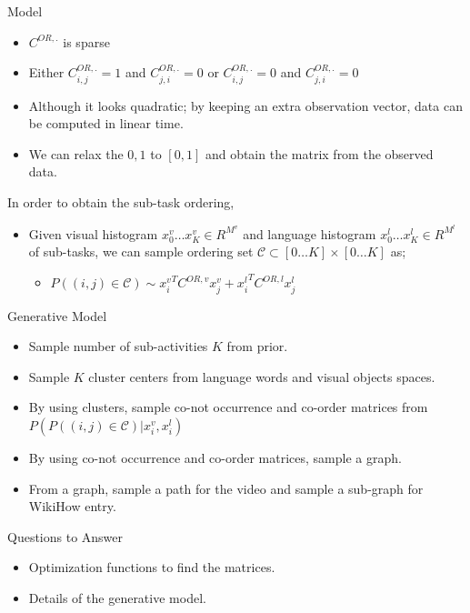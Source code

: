 \begin{frame}{Model}
\begin{itemize}
\item $C^{OR,.}$ is sparse
\item Either $C^{OR,.}_{i,j}=1$ and $C^{OR,.}_{j,i}=0$ or $C^{OR,.}_{i,j}=0$ and $C^{OR,.}_{j,i}=0$
\item Although it looks quadratic; by keeping an extra observation vector, data can be computed in linear time.
\item We can relax the ${0,1}$ to $[0,1]$ and obtain the matrix from the observed data.
\end{itemize}
In order to obtain the sub-task ordering,
\begin{itemize}
\item Given visual histogram $x^v_0 \ldots x^v_K \in R^{M^v}$ and language histogram $x^l_0 \ldots x^l_K \in R^{M^l}$ of sub-tasks, we can sample ordering set $\mathcal{C} \subset [0\ldots K]
 \times [0 \ldots K]$ as;
\begin{itemize}
\item $P((i,j) \in \mathcal{C}) \sim {x^v_i}^T C^{OR,v} x^v_j + {x^l_i}^T C^{OR,l} x^l_j$
\end{itemize}
\end{itemize}
\end{frame}

\begin{frame}{Generative Model}
\begin{itemize}
\item Sample number of sub-activities $K$ from prior.
\item Sample $K$ cluster centers from language words and visual objects spaces.
\item By using clusters, sample co-not occurrence and co-order matrices from $P(P((i,j) \in \mathcal{C})|x^v_i,x^l_i)$
\item By using co-not occurrence and co-order matrices, sample a graph.
\item From a graph, sample a path for the video and sample a sub-graph for WikiHow entry.
\end{itemize}
\end{frame}

\begin{frame}{Questions to Answer}
\begin{itemize}
\item Optimization functions to find the matrices.
\item Details of the generative model.
\end{itemize}
\end{frame}

\fi
